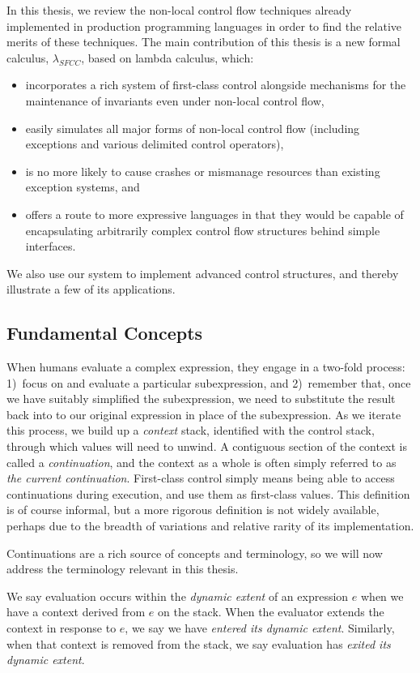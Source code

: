 \documentclass[11pt]{article}
\newcommand{\maybePage}{\null}
\begin{document}
In this thesis, we review the non-local control flow techniques already implemented in production programming languages in order to find the relative merits of these techniques.
The main contribution of this thesis is a new formal calculus, $\lambda_{SFCC}$, based on lambda calculus, which:
\begin{itemize}
\item incorporates a rich system of first-class control alongside mechanisms for the maintenance of invariants even under non-local control flow,
\item easily simulates all major forms of non-local control flow (including exceptions and various delimited control operators),
\item is no more likely to cause crashes or mismanage resources than existing exception systems, and
\item offers a route to more expressive languages in that they would be capable of encapsulating arbitrarily complex control flow structures behind simple interfaces.
\end{itemize}
We also use our system to implement advanced control structures, and thereby illustrate a few of its applications.

\maybePage
\subsection{Fundamental Concepts}
When humans evaluate a complex expression, they engage in a two-fold process: 1)~focus on and evaluate a particular subexpression, and 2)~remember that, once we have suitably simplified the subexpression, we need to substitute the result back into to our original expression in place of the subexpression.
As we iterate this process, we build up a \emph{context} stack, identified with the control stack, through which values will need to unwind.
A contiguous section of the context is called a \emph{continuation}, and the context as a whole is often simply referred to as \emph{the current continuation}.
First-class control simply means being able to access continuations during execution, and use them as first-class values.
This definition is of course informal, but a more rigorous definition is not widely available, perhaps due to the breadth of variations and relative rarity of its implementation.

Continuations are a rich source of concepts and terminology, so we will now address the terminology relevant in this thesis.

We say evaluation occurs within the \emph{dynamic extent} of an expression $e$ when we have a context derived from $e$ on the stack.
When the evaluator extends the context in response to $e$, we say we have \emph{entered its dynamic extent}.
Similarly, when that context is removed from the stack, we say evaluation has \emph{exited its dynamic extent}.
\end{document}
